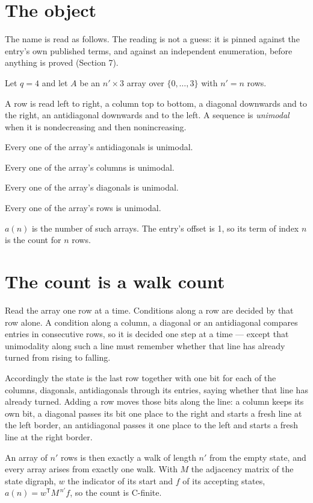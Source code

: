 \documentclass[11pt]{article}
\theoremstyle{definition}
\begin{document}
\section{The object}

The name is read as follows. The reading is not a guess: it is pinned against the entry's own published terms, and against an independent enumeration, before anything is proved (Section 7).

Let $q = 4$ and let $A$ be an $n' \times 3$ array over $\{0,\dots,3\}$ with $n' = n$ rows.

A row is read left to right, a column top to bottom, a diagonal downwards and to the right, an antidiagonal downwards and to the left. A sequence is {\itshape unimodal} when it is nondecreasing and then nonincreasing.

Every one of the array's antidiagonals is unimodal.

Every one of the array's columns is unimodal.

Every one of the array's diagonals is unimodal.

Every one of the array's rows is unimodal.

$a(n)$ is the number of such arrays. The entry's offset is 1, so its term of index $n$ is the count for $n$ rows.

\section{The count is a walk count}

Read the array one row at a time. Conditions along a row are decided by that row alone. A condition along a column, a diagonal or an antidiagonal compares entries in consecutive rows, so it is decided one step at a time --- except that unimodality along such a line must remember whether that line has already turned from rising to falling.

Accordingly the state is the last row together with one bit for each of the columns, diagonals, antidiagonals through its entries, saying whether that line has already turned. Adding a row moves those bits along the line: a column keeps its own bit, a diagonal passes its bit one place to the right and starts a fresh line at the left border, an antidiagonal passes it one place to the left and starts a fresh line at the right border.

An array of $n'$ rows is then exactly a walk of length $n'$ from the empty state, and every array arises from exactly one walk. With $M$ the adjacency matrix of the state digraph, $w$ the indicator of its start and $f$ of its accepting states, $a(n) = w^{\mathsf T}M^{\,n'}f$, so the count is C-finite.
\end{document}
